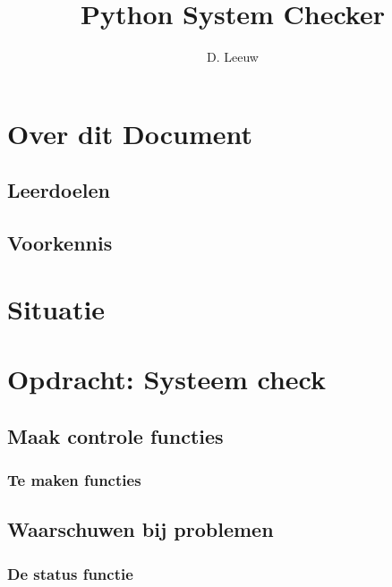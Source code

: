 \documentclass[a4paper,12pt,twoside,openright,titlepage]{article}
\author{D. Leeuw}
\title{Python System Checker}
\date{\today\\
1.0.0 \\
\vfill
\raggedright
\copyright\ 2026 Dennis Leeuw\\
}
\begin{document}

\maketitle


\section{Over dit Document}
\subsection{Leerdoelen}

\subsection{Voorkennis}




\section{Situatie}


\section{Opdracht: Systeem check}

\subsection{Maak controle functies}

\subsubsection{Te maken functies}


\subsection{Waarschuwen bij problemen}

\subsubsection{De status functie}

\end{document}
